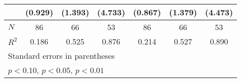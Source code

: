 {\begin{tabular}{l*{6}{c}}
            &     (0.929)         &     (1.393)         &     (4.733)         &     (0.867)         &     (1.379)         &     (4.473)         \\
\hline
\(N\)       &          86         &          66         &          53         &          86         &          66         &          53         \\
\(R^{2}\)   &       0.186         &       0.525         &       0.876         &       0.214         &       0.527         &       0.890         \\
\hline\hline
\multicolumn{7}{l}{\footnotesize Standard errors in parentheses}\\
\multicolumn{7}{l}{\footnotesize \sym{*} \(p<0.10\), \sym{**} \(p<0.05\), \sym{***} \(p<0.01\)}\\
\end{tabular}
}
